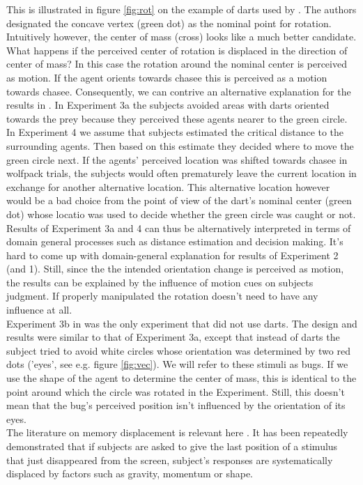 \documentclass[10pt]{article}
\begin{document}
This is illustrated in figure \ref{fig:rot} on the example of darts used by \cite{gao10}. 
The authors designated the concave vertex (green dot) as the nominal point for rotation. 
Intuitively however, the center of mass (cross) looks like a much better candidate. 
What happens if the perceived center of rotation is displaced in the direction of center of mass?
In this case the rotation around the nominal center is perceived as motion. 
If the agent orients towards chasee this is perceived as a motion towards chasee. 
Consequently, we can contrive an alternative explanation for the results in \cite{gao10}. 
In Experiment 3a the subjects avoided areas with darts oriented towards the prey because they perceived these agents nearer to the green circle. 
In Experiment 4 we assume that subjects estimated the critical distance to the surrounding agents. 
Then based on this estimate they decided where to move the green circle next. 
If the agents' perceived location was shifted towards chasee in wolfpack trials, the subjects would often prematurely leave the current location in exchange for another alternative location. 
This alternative location however would be a bad choice from the point of view of the dart's nominal center (green dot) whose locatio was used to decide whether the green circle was caught or not. 
Results of Experiment 3a and 4 can thus be alternatively interpreted in terms of domain general processes such as distance estimation and decision making. 
It's hard to come up with domain-general explanation for results of Experiment 2 (and 1). 
Still, since the the intended orientation change is perceived as motion, the results can be explained by the influence of motion cues on subjects judgment. 
If properly manipulated the rotation doesn't need to have any influence at all.\\
Experiment 3b in \cite{gao10} was the only experiment that did not use darts. 
The design and results were similar to that of Experiment 3a, except that instead of darts the subject tried to avoid white circles whose orientation was determined by two red dots ('eyes', see e.g. figure \ref{fig:vec}).
We will refer to these stimuli as bugs. 
If we use the shape of the agent to determine the center of mass, this is identical to the point around which the circle was rotated in the Experiment. 
Still, this doesn't mean that the bug's perceived position isn't influenced by the orientation of its eyes.\\
The literature on memory displacement is relevant here \cite{hubbard05}. 
It has been repeatedly demonstrated that if subjects are asked to give the last position of a stimulus that just disappeared from the screen, subject's responses are systematically displaced by factors such as gravity, momentum or shape. 
\end{document}
